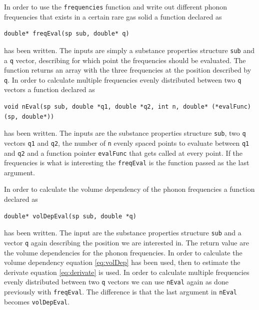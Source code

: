 \documentclass[11pt]{article}
\begin{document}
In order to use the \verb+frequencies+ function and write out different phonon frequencies that exists in a certain rare gas solid a function declared as 
\begin{lstlisting}
double* freqEval(sp sub, double* q)
\end{lstlisting} 
has been written. The inputs are simply a substance properties structure \verb+sub+ and a \verb+q+ vector, describing for which point the frequencies should be evaluated. The function returns an array with the three frequencies at the position described by \verb+q+. In order to calculate multiple frequencies evenly distributed between two \verb+q+ vectors a function declared as 
\begin{lstlisting}
void nEval(sp sub, double *q1, double *q2, int n, double* (*evalFunc)(sp, double*))
\end{lstlisting}
has been written. The inputs are the substance properties structure \verb+sub+, two \verb+q+ vectors \verb+q1+ and \verb+q2+, the number of \verb+n+ evenly spaced points to evaluate between \verb+q1+ and \verb+q2+ and a function pointer 
\verb+evalFunc+ that gets called at every point. If the frequencies is what is interesting the \verb+freqEval+ is the function passed as the last argument.


In order to calculate the volume dependency of the phonon frequencies a function declared as
\begin{lstlisting}
double* volDepEval(sp sub, double *q)
\end{lstlisting} 
has been written. The input are the substance properties structure \verb+sub+ and a vector \verb+q+ again describing the position we are interested in. The return value are the volume dependencies for the phonon frequencies. In order to calculate the volume dependency equation \ref{eq:volDep} has been used, then to estimate the derivate equation \ref{eq:derivate} is used. In order to calculate multiple frequencies evenly distributed between two \verb+q+ vectors we can use \verb+nEval+ again as done previously with \verb+freqEval+. The difference is that the last argument in \verb+nEval+ becomes \verb+volDepEval+.
\end{document}
